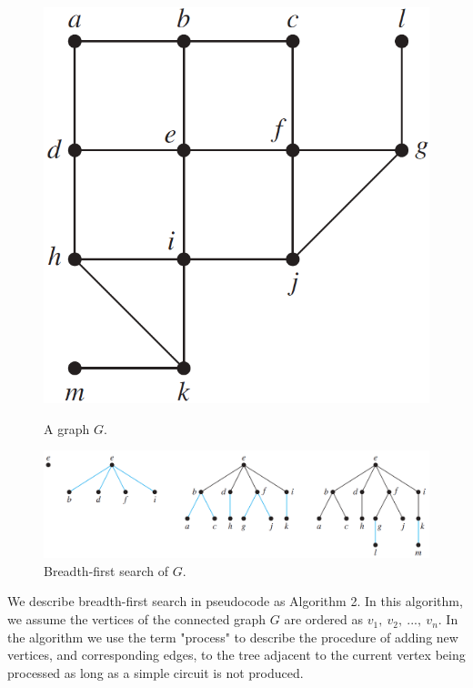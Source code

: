 \documentclass{article}
\begin{document}
\begin{figure}[h!]
\begin{minipage}[c]{0.2\textwidth}
    \centering
    \includegraphics[width=\textwidth]{img/ch11.4-figure9.png}
    \caption{A graph $G$.}
\end{minipage}\hfill
\begin{minipage}[c]{0.75\textwidth}
    \centering
    \includegraphics[width=\textwidth]{img/ch11.4-figure10.png}
    \caption{Breadth-first search of $G$.}
\end{minipage}\hfill
\end{figure}

We describe breadth-first search in pseudocode as Algorithm 2. In this algorithm, we assume the vertices of the connected graph $G$ are ordered as $v_1,\ v_2,\ ...,\ v_n$. In the algorithm we use the term "process" to describe the procedure of adding new vertices, and corresponding edges, to the tree adjacent to the current vertex being processed as long as a simple circuit is not produced.
\end{document}
